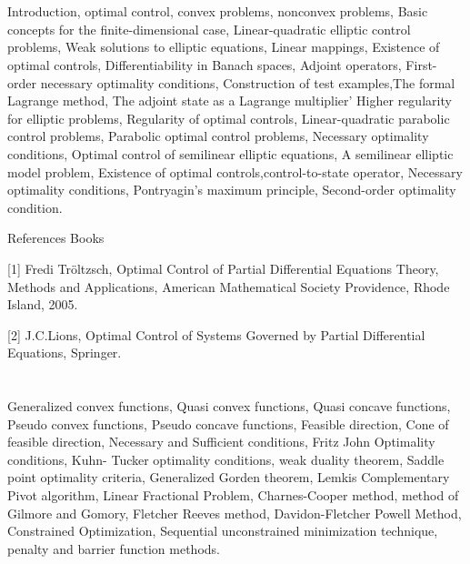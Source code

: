 %
%  
%
% 
%
%
%
%
%

\section{\dsccourseinfo}

Introduction, optimal control, convex problems, nonconvex problems, Basic concepts for the finite-dimensional case, Linear-quadratic elliptic control problems, Weak solutions to elliptic equations, Linear mappings, Existence of optimal controls, Differentiability in Banach spaces, Adjoint operators, First-order necessary optimality conditions, Construction of test examples,The formal Lagrange method, The adjoint state as a Lagrange multiplier’ Higher regularity for elliptic problems, Regularity of optimal controls, Linear-quadratic parabolic control problems, Parabolic optimal control problems, Necessary optimality conditions, Optimal control of semilinear elliptic equations, A semilinear elliptic model problem, Existence of optimal controls,control-to-state operator, Necessary optimality conditions, Pontryagin’s maximum principle, Second-order optimality condition. 
 

References Books  

[1] Fredi Tröltzsch, Optimal Control of Partial Differential Equations Theory, Methods and Applications, American Mathematical Society Providence, Rhode Island, 2005. 

   [2]  J.C.Lions, Optimal Control of Systems Governed by Partial Differential Equations, Springer. 

 
\section{\dsccourseinfo}

 
Generalized convex functions, Quasi convex functions, Quasi concave functions, Pseudo convex functions, Pseudo concave functions, Feasible direction, Cone of feasible direction, Necessary and Sufficient conditions, Fritz John Optimality conditions, Kuhn- Tucker optimality conditions, weak duality theorem, Saddle point optimality criteria, Generalized Gorden theorem, Lemkis Complementary Pivot algorithm, Linear Fractional Problem, Charnes-Cooper method, method of Gilmore and Gomory, Fletcher Reeves method, Davidon-Fletcher Powell Method, Constrained Optimization, Sequential unconstrained minimization technique, penalty and barrier function methods.   

